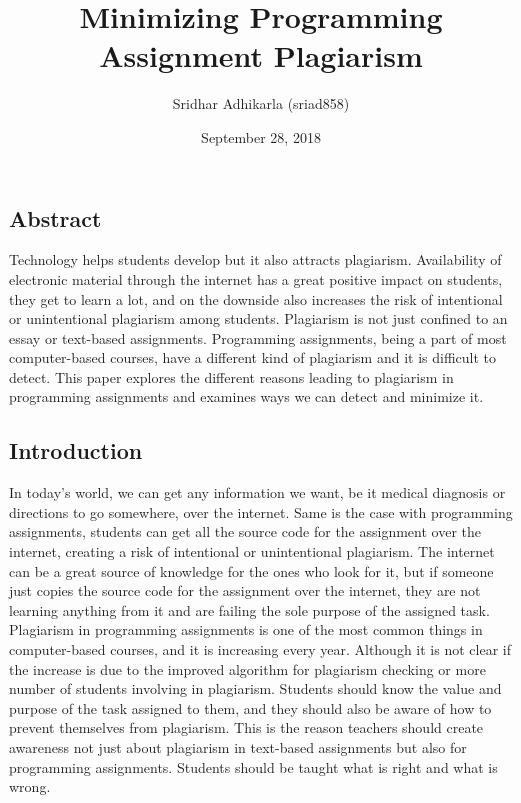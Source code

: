 \documentclass[a4paper]{article}
\title{Minimizing Programming Assignment Plagiarism}
\author{Sridhar Adhikarla (sriad858)}
\date{September 28, 2018}
\begin{document}
\maketitle

\subsection{Abstract}\label{abstract}

Technology helps students develop but it also attracts plagiarism.
Availability of electronic material through the internet has a great
positive impact on students, they get to learn a lot, and on the
downside also increases the risk of intentional or unintentional
plagiarism among students. Plagiarism is not just confined to an essay
or text-based assignments. Programming assignments, being a part of most
computer-based courses, have a different kind of plagiarism and it is
difficult to detect. This paper explores the different reasons leading
to plagiarism in programming assignments and examines ways we can detect
and minimize it.

\subsection{Introduction}\label{introduction}

In today's world, we can get any information we want, be it medical
diagnosis or directions to go somewhere, over the internet. Same is the
case with programming assignments, students can get all the source code
for the assignment over the internet, creating a risk of intentional or
unintentional plagiarism. The internet can be a great source of
knowledge for the ones who look for it, but if someone just copies the
source code for the assignment over the internet, they are not learning
anything from it and are failing the sole purpose of the assigned task.
Plagiarism in programming assignments is one of the most common things
in computer-based courses, and it is increasing every year. Although it
is not clear if the increase is due to the improved algorithm for
plagiarism checking or more number of students involving in plagiarism.
Students should know the value and purpose of the task assigned to them,
and they should also be aware of how to prevent themselves from
plagiarism. This is the reason teachers should create awareness not just
about plagiarism in text-based assignments but also for programming
assignments. Students should be taught what is right and what is wrong.
\end{document}

